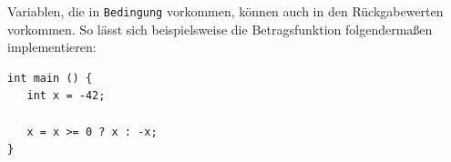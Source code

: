 Variablen, die in \texttt{Bedingung} vorkommen, können auch in den Rückgabewerten vorkommen. So lässt sich beispielsweise die Betragsfunktion folgendermaßen implementieren:

\begin{codebox}
\begin{verbatim}
int main () {
   int x = -42;
   
   x = x >= 0 ? x : -x;
}
\end{verbatim}
\end{codebox}
